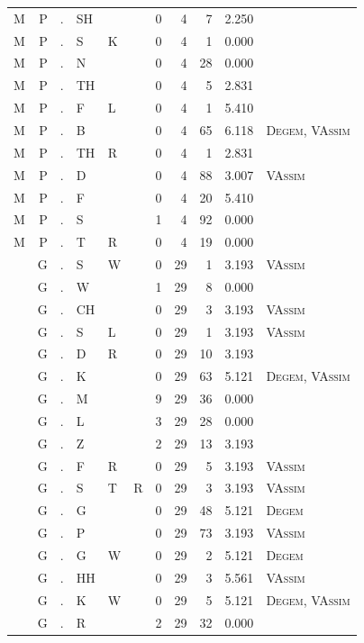 \documentclass[12pt]{article}
\begin{document}
\begin{longtable}{r@{ } r@{ } c@{ } l@{ } l@{ } l@{ } r r r r l }
M & P & . & SH &  &  & 0 & 4 & 7 & 2.250 &  \\
M & P & . & S & K &  & 0 & 4 & 1 & 0.000 &  \\
M & P & . & N &  &  & 0 & 4 & 28 & 0.000 &  \\
M & P & . & TH &  &  & 0 & 4 & 5 & 2.831 &  \\
M & P & . & F & L &  & 0 & 4 & 1 & 5.410 &  \\
M & P & . & B &  &  & 0 & 4 & 65 & 6.118 & \textsc{Degem}, \textsc{VAssim} \\
M & P & . & TH & R &  & 0 & 4 & 1 & 2.831 &  \\
M & P & . & D &  &  & 0 & 4 & 88 & 3.007 & \textsc{VAssim} \\
M & P & . & F &  &  & 0 & 4 & 20 & 5.410 &  \\
M & P & . & S &  &  & 1 & 4 & 92 & 0.000 &  \\
M & P & . & T & R &  & 0 & 4 & 19 & 0.000 &  \\
 & G & . & S & W &  & 0 & 29 & 1 & 3.193 & \textsc{VAssim} \\
 & G & . & W &  &  & 1 & 29 & 8 & 0.000 &  \\
 & G & . & CH &  &  & 0 & 29 & 3 & 3.193 & \textsc{VAssim} \\
 & G & . & S & L &  & 0 & 29 & 1 & 3.193 & \textsc{VAssim} \\
 & G & . & D & R &  & 0 & 29 & 10 & 3.193 &  \\
 & G & . & K &  &  & 0 & 29 & 63 & 5.121 & \textsc{Degem}, \textsc{VAssim} \\
 & G & . & M &  &  & 9 & 29 & 36 & 0.000 &  \\
 & G & . & L &  &  & 3 & 29 & 28 & 0.000 &  \\
 & G & . & Z &  &  & 2 & 29 & 13 & 3.193 &  \\
 & G & . & F & R &  & 0 & 29 & 5 & 3.193 & \textsc{VAssim} \\
 & G & . & S & T & R & 0 & 29 & 3 & 3.193 & \textsc{VAssim} \\
 & G & . & G &  &  & 0 & 29 & 48 & 5.121 & \textsc{Degem} \\
 & G & . & P &  &  & 0 & 29 & 73 & 3.193 & \textsc{VAssim} \\
 & G & . & G & W &  & 0 & 29 & 2 & 5.121 & \textsc{Degem} \\
 & G & . & HH &  &  & 0 & 29 & 3 & 5.561 & \textsc{VAssim} \\
 & G & . & K & W &  & 0 & 29 & 5 & 5.121 & \textsc{Degem}, \textsc{VAssim} \\
 & G & . & R &  &  & 2 & 29 & 32 & 0.000 &  \\

\end{longtable}
\end{document}
